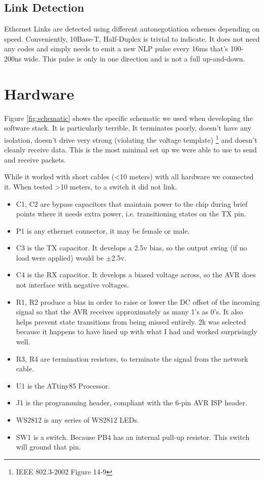 \documentclass[13pt]{ltxdoc}
\begin{document}
\subsection{Link Detection}
Ethernet Links are detected using different autonegotiation schemes depending on speed.  Conveniently,
10Base-T, Half-Duplex is trivial to indicate.  It does not need any codes and simply needs to emit
a new NLP pulse every 16ms that's 100-200ns wide.  This pulse is only in one direction and is not a full
up-and-down.

\section{Hardware}
Figure \ref{fig:schematic} shows the specific schematic we used when developing the software stack.
It is particularly terrible.  It terminates poorly, doesn't have any isolation, doesn't drive very strong (violating the
voltage template) \footnote{IEEE 802.3-2002 Figure 14-9}
and doesn't cleanly receive data.  This is the most minimal set up we were able to use to send and receive packets.

While it worked with short cables (\textless 10 meters) with all hardware we connected it.  When tested \textgreater 10 meters,
to a switch it did not link.

\begin{itemize}
\item C1, C2 are bypass capacitors that maintain power to the chip during brief points where it needs extra power, i.e. transitioning states on the TX pin.
\item P1 is any ethernet connector, it may be female or male.
\item C3 is the TX capacitor.  It develops a 2.5v bias, so the output swing (if no load were applied) would be $\pm$2.5v.
\item C4 is the RX capacitor.  It develops a biased voltage across, so the AVR does not interface with negative voltages.
\item R1, R2 produce a bias in order to raise or lower the DC offset of the incoming signal so that the AVR receives approximately as many 1's as 0's.  It also helps prevent state transitions from being missed entirely.  2k was selected because it happens to have lined up with what I had and worked surprisingly well.
\item R3, R4 are termination resistors, to terminate the signal from the network cable.
\item U1 is the ATtiny85 Processor.
\item J1 is the programming header, compliant with the 6-pin AVR ISP header.
\item WS2812 is any series of WS2812 LEDs.
\item SW1 is a switch.  Because PB4 has an internal pull-up resistor.  This switch will ground that pin.
\end{itemize}
\end{document}

